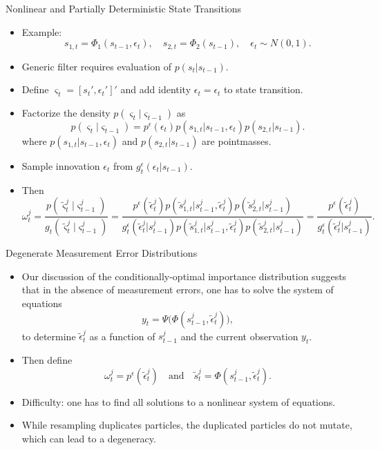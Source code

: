 \documentclass[presentation]{beamer}
\newcommand{\spitem}{\vspace{.3cm}\item}
\begin{document}
\begin{frame}[label={sec:orgbe8d74f}]{Nonlinear and Partially Deterministic State Transitions}
\begin{itemize}
	\spitem Example:
	\[
	s_{1,t} = \Phi_1(s_{t-1},\epsilon_t), \quad s_{2,t} = \Phi_2(s_{t-1}), \quad \epsilon_t \sim N(0,1).
	\]
	\item Generic filter requires evaluation of $p(s_t|s_{t-1})$.
	\spitem Define $\varsigma_t = [s_t',\epsilon_t']'$ and add identity $\epsilon_t =
	\epsilon_t$ to state transition.
	\spitem Factorize the density
	$p(\varsigma_t|\varsigma_{t-1})$ as
	\[
	p(\varsigma_t|\varsigma_{t-1}) = p^\epsilon(\epsilon_t) p(s_{1,t}|s_{t-1},\epsilon_t) p(s_{2,t}|s_{t-1}).
	\]
	where $p(s_{1,t}|s_{t-1},\epsilon_t)$ and $p(s_{2,t}|s_{t-1})$ are
	pointmasses.
	\spitem Sample innovation
	$\epsilon_t$ from $g_t^\epsilon(\epsilon_t|s_{t-1})$.
	\spitem Then
	\[
	\omega_t^j = \frac{ p(\tilde{\varsigma}^j_t|\varsigma^j_{t-1}) }{g_t (\tilde{\varsigma}^j_t|\varsigma^j_{t-1})}
	= \frac{ p^\epsilon( \tilde{\epsilon}_t^j) p(\tilde{s}_{1,t}^j|s^j_{t-1},\tilde{\epsilon}^j_t) p(\tilde{s}^j_{2,t}|s^j_{t-1}) }
	{ g_t^\epsilon(\tilde{\epsilon}^j_t|s^j_{t-1}) p(\tilde{s}_{1,t}^j|s^j_{t-1},\tilde{\epsilon}^j_t) p(\tilde{s}^j_{2,t}|s^j_{t-1}) }
	= \frac{ p^\epsilon(\tilde{\epsilon}_t^j)}{g_t^\epsilon(\tilde{\epsilon}^j_t|s^j_{t-1})}.
	\label{eq_pfomegaepsilon}
	\]		
\end{itemize}
\end{frame}


\begin{frame}[label={sec:org3820dea}]{Degenerate Measurement Error Distributions}
\begin{itemize}
	\item  Our discussion of the conditionally-optimal
	importance distribution suggests that in the absence of measurement
	errors, one has to solve the system of equations
	\[ y_t = \Psi \big(
	\Phi( s_{t-1}^j,\tilde{\epsilon}_t^j) \big),
	\label{eq_pfepssystem}
	\]
	to determine $\tilde{\epsilon}_t^j$ as a function of $s_{t-1}^j$ and the current observation $y_t$. 
	\spitem Then define
	\[
	\omega_t^j = p^\epsilon(\tilde{\epsilon}_t^j) \quad \mbox{and} \quad
	\tilde{s}_t^j = \Phi( s_{t-1}^j,\tilde{\epsilon}_t^j).
	\]
	\item Difficulty: one has to find all solutions to a nonlinear system of equations.
	\spitem While resampling duplicates particles, the duplicated particles do not mutate, which
	can lead to a degeneracy. 
\end{itemize}
\end{frame}
\end{document}
